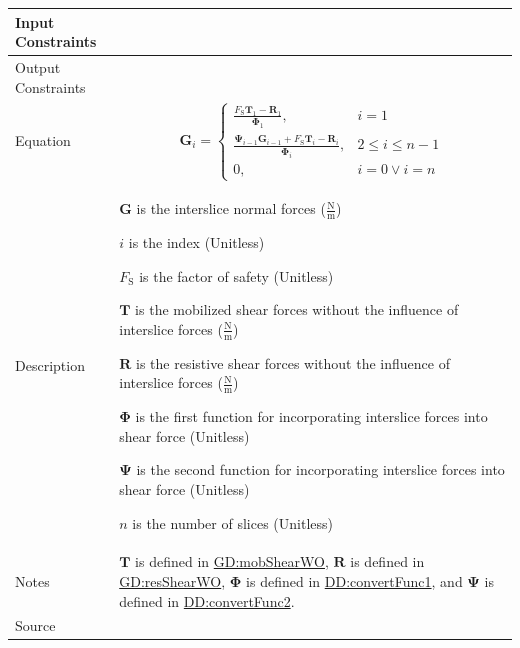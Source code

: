 \documentclass[12pt]{article}
\begin{document}
\begin{minipage}{\textwidth}
\begin{tabular}{>{\raggedright}p{}>{\raggedright\arraybackslash}p{}}
\\ \midrule
Input Constraints & 
\\ \midrule
Output Constraints & 
\\ \midrule
Equation & \begin{displaymath}
           {\symbf{G}}_{i}=\begin{cases}
                           \frac{{F_{\text{S}}} {\symbf{T}}_{1}-{\symbf{R}}_{1}}{{\symbf{Φ}}_{1}}, & i=1\\
                           \frac{{\symbf{Ψ}}_{i-1} {\symbf{G}}_{i-1}+{F_{\text{S}}} {\symbf{T}}_{i}-{\symbf{R}}_{i}}{{\symbf{Φ}}_{i}}, & 2\leq{}i\leq{}n-1\\
                           0, & i=0\lor{}i=n
                           \end{cases}
           \end{displaymath}
\\ \midrule
Description & \begin{symbDescription}
              \item{$\symbf{G}$ is the interslice normal forces ($\frac{\text{N}}{\text{m}}$)}
              \item{$i$ is the index (Unitless)}
              \item{${F_{\text{S}}}$ is the factor of safety (Unitless)}
              \item{$\symbf{T}$ is the mobilized shear forces without the influence of interslice forces ($\frac{\text{N}}{\text{m}}$)}
              \item{$\symbf{R}$ is the resistive shear forces without the influence of interslice forces ($\frac{\text{N}}{\text{m}}$)}
              \item{$\symbf{Φ}$ is the first function for incorporating interslice forces into shear force (Unitless)}
              \item{$\symbf{Ψ}$ is the second function for incorporating interslice forces into shear force (Unitless)}
              \item{$n$ is the number of slices (Unitless)}
              \end{symbDescription}
\\ \midrule
Notes & $\symbf{T}$ is defined in \hyperref[GD:mobShearWO]{GD:mobShearWO}, $\symbf{R}$ is defined in \hyperref[GD:resShearWO]{GD:resShearWO}, $\symbf{Φ}$ is defined in \hyperref[DD:convertFunc1]{DD:convertFunc1}, and $\symbf{Ψ}$ is defined in \hyperref[DD:convertFunc2]{DD:convertFunc2}.
        
\\ \midrule
Source & \cite{chen2005}
         

\end{tabular}
\end{minipage}
\end{document}

